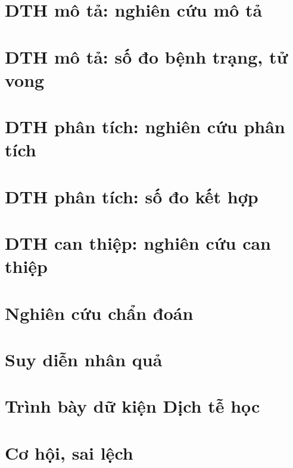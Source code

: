 \documentclass[
]{book}
\begin{document}
\hypertarget{dthcb_ncmota}{%
\chapter{DTH mô tả: nghiên cứu mô tả}\label{dthcb_ncmota}}

\hypertarget{dthcb_sodobenhtrang}{%
\chapter{DTH mô tả: số đo bệnh trạng, tử vong}\label{dthcb_sodobenhtrang}}

\hypertarget{dthcb_ncpt}{%
\chapter{DTH phân tích: nghiên cứu phân tích}\label{dthcb_ncpt}}

\hypertarget{dthcb_sodokethop}{%
\chapter{DTH phân tích: số đo kết hợp}\label{dthcb_sodokethop}}

\hypertarget{dthcb_ncct}{%
\chapter{DTH can thiệp: nghiên cứu can thiệp}\label{dthcb_ncct}}

\hypertarget{dthcb_nccd}{%
\chapter{Nghiên cứu chẩn đoán}\label{dthcb_nccd}}

\hypertarget{dthcb_sdnq}{%
\chapter{Suy diễn nhân quả}\label{dthcb_sdnq}}

\hypertarget{dthcb_trinhbay}{%
\chapter{Trình bày dữ kiện Dịch tễ học}\label{dthcb_trinhbay}}

\hypertarget{dthcb_cohoi}{%
\chapter{Cơ hội, sai lệch}\label{dthcb_cohoi}}
\end{document}
